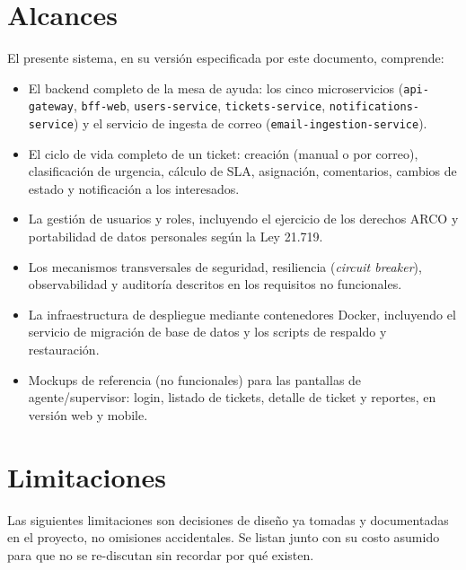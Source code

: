 \documentclass[11pt,a4paper]{article}
\begin{document}
\section{Alcances}

El presente sistema, en su versión especificada por este documento,
comprende:

\begin{itemize}[leftmargin=1.2cm]
  \item El backend completo de la mesa de ayuda: los cinco microservicios
    (\texttt{api-gateway}, \texttt{bff-web}, \texttt{users-service},
    \texttt{tickets-service}, \texttt{notifications-service}) y el servicio
    de ingesta de correo (\texttt{email-ingestion-service}).
  \item El ciclo de vida completo de un ticket: creación (manual o por
    correo), clasificación de urgencia, cálculo de SLA, asignación,
    comentarios, cambios de estado y notificación a los interesados.
  \item La gestión de usuarios y roles, incluyendo el ejercicio de los
    derechos ARCO y portabilidad de datos personales según la Ley 21.719.
  \item Los mecanismos transversales de seguridad, resiliencia
    (\emph{circuit breaker}), observabilidad y auditoría descritos en los
    requisitos no funcionales.
  \item La infraestructura de despliegue mediante contenedores Docker,
    incluyendo el servicio de migración de base de datos y los scripts de
    respaldo y restauración.
  \item Mockups de referencia (no funcionales) para las pantallas de
    agente/supervisor: login, listado de tickets, detalle de ticket y
    reportes, en versión web y mobile.
\end{itemize}

\section{Limitaciones}

Las siguientes limitaciones son decisiones de diseño ya tomadas y
documentadas en el proyecto, no omisiones accidentales. Se listan junto con
su costo asumido para que no se re-discutan sin recordar por qué existen.
\end{document}
